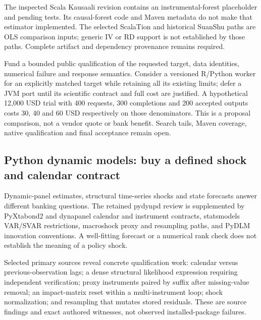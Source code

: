 The inspected Scala Kausaali revision contains an instrumental-forest
placeholder and pending tests. Its causal-forest code and Maven metadata
do not make that estimator implemented. The selected ScalaTion and
historical SuanShu paths are OLS comparison inputs; generic IV or RD
support is not established by those paths. Complete artifact and
dependency provenance remains required.
\citep{exec25_javaiv_kausaali,exec25_javaiv_scalation,exec25_javaiv_suan}

Fund a bounded public qualification of the requested target, data
identities, numerical failure and response semantics. Consider a
versioned R/Python worker for an explicitly matched target while
retaining all its existing limits; defer a JVM port until its scientific
contract and full cost are justified. A hypothetical 12,000 USD trial
with 400 requests, 300 completions and 200 accepted outputs costs 30, 40
and 60 USD respectively on those denominators. This is a proposal
comparison, not a vendor quote or bank benefit. Search tails, Maven
coverage, native qualification and final acceptance remain open.
\citep{exec25_javaiv_choice}

\hypertarget{python-dynamic-models-buy-a-defined-shock-and-calendar-contract}{%
\subsection{Python dynamic models: buy a defined shock and calendar
contract}\label{python-dynamic-models-buy-a-defined-shock-and-calendar-contract}}

Dynamic-panel estimates, structural time-series shocks and state
forecasts answer different banking questions. The retained pydynpd
review is supplemented by PyXtabond2 and dynapanel calendar and
instrument contracts, statsmodels VAR/SVAR restrictions, macroshock
proxy and resampling paths, and PyDLM innovation conventions. A
well-fitting forecast or a numerical rank check does not establish the
meaning of a policy shock.
\citep{exec25_pydyn_statsmodels,exec25_pydyn_xtabond,exec25_pydyn_dynapanel,exec25_pydyn_pydlm}

Selected primary sources reveal concrete qualification work: calendar
versus previous-observation lags; a dense structural likelihood
expression requiring independent verification; proxy instruments paired
by suffix after missing-value removal; an impact-matrix reset within a
multi-instrument loop; shock normalization; and resampling that mutates
stored residuals. These are source findings and exact authored
witnesses, not observed installed-package failures.
\citep{exec25_pydyn_macroshock,exec25_pydyn_choice}

